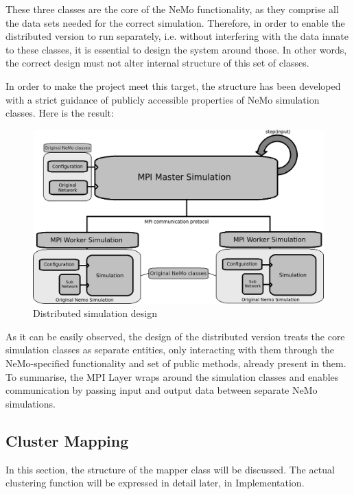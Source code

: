 These three classes are the core of the NeMo functionality, as they comprise all the data sets needed for the correct simulation. Therefore, in order to enable the distributed version to run separately, i.e. without interfering with the data innate to these classes, it is essential to design the system around those. In other words, the correct design must not alter internal structure of this set of classes.

In order to make the project meet this target, the structure has been developed with a strict guidance of publicly accessible properties of NeMo simulation classes. Here is the result:

\begin{figure}[h!]
\begin{center}
\includegraphics[scale = 0.5]{images/distributed_version_separated_design.png}
\end{center}
\caption{Distributed simulation design}
\end{figure}

As it can be easily observed, the design of the distributed version treats the core simulation classes as separate entities, only interacting with them through the NeMo-specified functionality and set of public methods, already present in them. To summarise, the MPI Layer wraps around the simulation classes and enables communication by passing input and output data between separate NeMo simulations.

\subsection{Cluster Mapping}

In this section, the structure of the mapper class will be discussed. The actual clustering function will be expressed in detail later, in Implementation.

